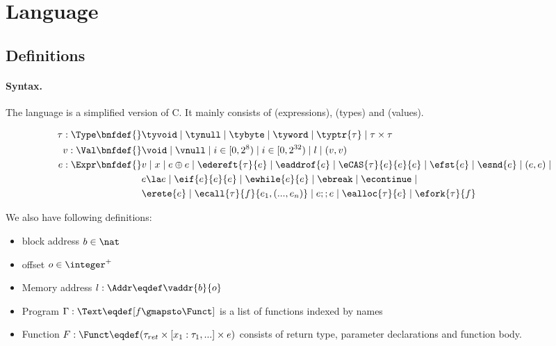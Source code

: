 \section{Language}
\label{sec:language}

\subsection{Definitions}

\paragraph{Syntax.}\label{p:type}

The language is a simplified version of C. It mainly consists of
\Expr{} (expressions), \Type{} (types) and \Val{} (values).

\begin{align*}
    \tau : \Type \bnfdef{}&
        \tyvoid \mid
        \tynull \mid
        \tybyte \mid
        \tyword \mid
        \typtr{\tau} \mid
        \tau \times \tau
\\
    v : \Val \bnfdef{}&
        \void \mid
        \vnull \mid
        i \in [0, 2^8) \mid
        i \in [0, 2^{32}) \mid
        l \mid
        (v, v)
\\
    e : \Expr \bnfdef{}&
       v \mid
       x \mid
       e \oplus e \mid
       \edereft{\tau}{e} \mid
       \eaddrof{e} \mid
       \eCAS{\tau}{e}{e}{e} \mid
       \efst{e} \mid
       \esnd{e} \mid
       (e, e) \mid
       \\&
       e \la e \mid
       \eif{e}{e}{e} \mid
       \ewhile{e}{e} \mid
       \ebreak \mid
       \econtinue \mid
       \\&
       \erete{e} \mid
       \ecall{\tau}{f}{e_1, (..., e_n)} \mid
       e ;; e \mid
       \ealloc{\tau}{e} \mid
       \efork{\tau}{f}
\\
\end{align*}

We also have following definitions:

\begin{itemize}
  \item block address $b \in \nat$
  \item offset $o \in \integer^{+}$
  \item Memory address $l: \Addr \eqdef \vaddr{b}{o}$
  \item Program $\Gamma: \Text \eqdef [f \gmapsto \Funct]$ is a list of functions indexed by names
  \item Function $F: \Funct \eqdef (\tau_{ret} \times [x_1 : \tau_1, ...] \times e)$ consists of return type,
    parameter declarations and function body.
\end{itemize}

